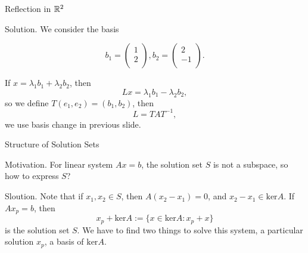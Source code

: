 \documentclass[hyperref={pdfpagelabels=true}]{beamer}
\newcommand{\<}{\langle}
\renewcommand{\>}{\rangle}
\begin{document}
\begin{frame}{Reflection in $\mathbb{R}^{2}$}
    \begin{block}{Solution.}
        We consider the basis 
        \begin{spacing}{0.5}
        \[b_{1} = \begin{pmatrix}
            1\\
            2\\
        \end{pmatrix},b_{2} = \begin{pmatrix}
            2\\
            -1\\
        \end{pmatrix}.\]
    \end{spacing}
    If $x = \lambda_{1}b_{1}+\lambda_{2}b_{2}$, then 
    \[Lx = \lambda_{1}b_{1}-\lambda_{2}b_{2},\]
    so we define $T(e_{1},e_{2}) = (b_{1},b_{2})$, then 
    \[L = TAT^{-1},\]
    we use basis change in previous slide.
\end{block}
\end{frame}

\begin{frame}{Structure of Solution Sets}
    \begin{block}{Motivation.}
        For linear system $Ax = b$, the solution set $S$ is not a subspace, so how to express $S$?
    \end{block}
    \begin{block}{Sloution.}
        Note that if $x_{1},x_{2} \in S$, then $A(x_{2}-x_{1}) = 0$, and $x_{2}-x_{1} \in \text{ker}A$. If $Ax_{p} = b$, then 
        \[x_{p}+\text{ker}A:=\{x \in \text{ker}A:x_{p}+x\}\]
        is the solution set $S$. We have to find two things to solve this system, a particular solution $x_{p}$, a basis of $\text{ker}A$.
    \end{block}
\end{frame}
\end{document}
